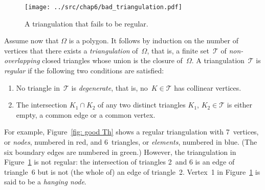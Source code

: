 \begin{figure}
\caption{A triangulation that fails to be regular.}\label{fig: bad Th}
\begin{center}
\texttt{[image: ../src/chap6/bad\_triangulation.pdf]}
\end{center}
\end{figure}

Assume now that $\Omega$ is a polygon.  It follows by induction on the number 
of vertices that there exists a \emph{triangulation} of~$\Omega$, that is, a 
finite set~$\mathcal{T}$ of \emph{non-overlapping} closed triangles whose 
union is the closure of~$\Omega$. A triangulation~$\mathcal{T}$ is 
\emph{regular} if the following two conditions are satisfied:
\begin{enumerate}
\item No triangle in~$\mathcal{T}$ is \emph{degenerate}, that is, 
no~$K\in\mathcal{T}$ has collinear vertices.
\item The intersection $K_1\cap K_2$ of any two distinct triangles $K_1$, 
$K_2\in\mathcal{T}$ is either empty, a common edge or a common vertex.
\end{enumerate}
For example, Figure~\ref{fig: good Th} shows a regular triangulation with 
7~vertices, or \emph{nodes}, numbered in red, and 6~triangles, or 
\emph{elements}, numbered in blue.  (The six boundary edges are 
numbered in green.) However, the triangulation in 
Figure~\ref{fig: bad Th} is not regular: the intersection of triangles 2~and 6 
is an edge of triangle~6 but is not (the whole of) an edge of triangle~2.
Vertex~1 in Figure~\ref{fig: bad Th} is said to be a \emph{hanging node}.

